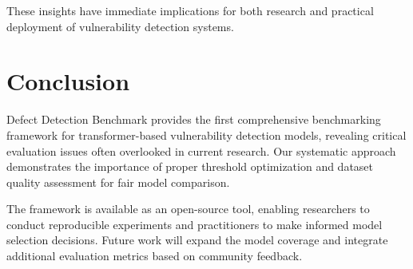 \documentclass[letterpaper]{article}
\begin{document}
These insights have immediate implications for both research and practical deployment of vulnerability detection systems.

\section{Conclusion}

Defect Detection Benchmark provides the first comprehensive benchmarking framework for transformer-based vulnerability detection models, revealing critical evaluation issues often overlooked in current research. Our systematic approach demonstrates the importance of proper threshold optimization and dataset quality assessment for fair model comparison.

The framework is available as an open-source tool, enabling researchers to conduct reproducible experiments and practitioners to make informed model selection decisions. Future work will expand the model coverage and integrate additional evaluation metrics based on community feedback.



\end{document}
